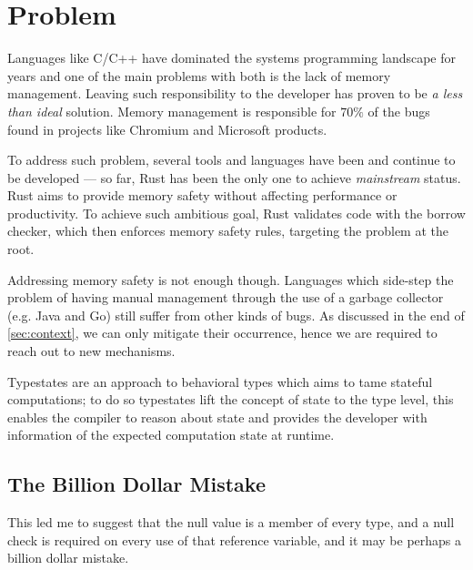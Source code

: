 \section{Problem}\label{sec:problem}

Languages like C/C++ have dominated the systems programming landscape for years and
one of the main problems with both is the lack of memory management.
Leaving such responsibility to the developer has proven to be \emph{a less than ideal} solution.
Memory management is responsible for $70\%$ of the bugs found in projects like Chromium
and Microsoft products.

To address such problem, several tools and languages have been and continue to be developed ---
so far, Rust has been the only one to achieve \emph{mainstream} status.
Rust aims to provide memory safety without affecting performance or productivity.
To achieve such ambitious goal, Rust validates code with the borrow checker, which then enforces memory safety rules,
targeting the problem at the root.

Addressing memory safety is not enough though.
Languages which side-step the problem of having manual management
through the use of a garbage collector (e.g. Java and Go) still suffer from other kinds of bugs.
As discussed in the end of \autoref{sec:context}, we can only mitigate their occurrence,
hence we are required to reach out to new mechanisms.

Typestates are an approach to behavioral types which aims to tame stateful computations;
to do so typestates lift the concept of state to the type level,
this enables the compiler to reason about state and provides the developer
with information of the expected computation state at runtime.

\subsection{The Billion Dollar Mistake}

\begin{displayquote}
    This led me to suggest that the null value is a member of every type,
    and a null check is required on every use of that reference variable,
    and it may be perhaps a billion dollar mistake.
\end{displayquote}

